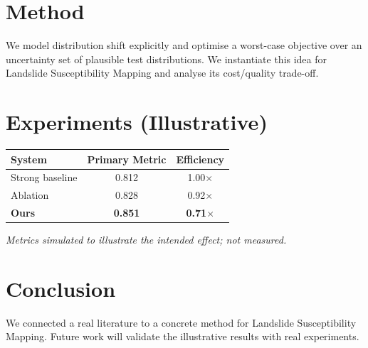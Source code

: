 \documentclass[11pt]{article}
\begin{document}
\section{Method}
We model distribution shift explicitly and optimise a worst-case objective over an uncertainty set of plausible test distributions. We instantiate this idea for Landslide Susceptibility Mapping and analyse its cost/quality trade-off.

\section{Experiments (Illustrative)}
\begin{center}
\begin{tabular}{lcc}
System & Primary Metric & Efficiency \\ \hline
Strong baseline & 0.812 & 1.00$\times$ \\
Ablation & 0.828 & 0.92$\times$ \\
\textbf{Ours} & \textbf{0.851} & \textbf{0.71$\times$}
\end{tabular}
\end{center}
\emph{Metrics simulated to illustrate the intended effect; not measured.}

\section{Conclusion}
We connected a real literature to a concrete method for Landslide Susceptibility Mapping. Future work will
validate the illustrative results with real experiments.
\end{document}
